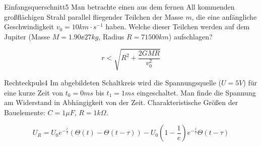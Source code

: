 \begin{problem}{Einfangsquerschnitt}{5}
Man betrachte einen aus dem fernen All kommenden großflächigen Strahl parallel fliegender Teilchen der Masse $m$, die eine anfängliche Geschwindigkeit $v_0=10 \unit{km \cdot s^{-1}}$ haben. Welche dieser Teilchen werden auf dem Jupiter (Masse $M=1.90 \ee{27} \unit{kg}$, Radius $R=71500 \unit{km}$) aufschlagen?

\begin{solution}
\[
r<\sqrt{R^2+\frac{2 GMR}{v_0^2}}
\]
\end{solution}
\end{problem}

\begin{problem}{Rechteckpuls}{4}
Im abgebildeten Schaltkreis wird die Spannungsquelle ($U=5 \unit{V}$) für eine kurze Zeit von $t_0 = 0 \unit{ms}$ bis $t_1 = 1 \unit{ms}$ eingeschaltet. Man finde die Spannung am Widerstand in Abhängigkeit von der Zeit. Charakteristische Größen der Bauelemente: $C=1 \unit{\mu F}$, $R=1 \unit{k\Omega}$.

\begin{solution}
\[
U_R=U_0 e^{-\frac t \tau} (\Theta(t)-\Theta(t-\tau))-U_0 (1-\frac 1e) e^{-\frac t \tau} \Theta(t-\tau)
\]
\end{solution}
\end{problem}



